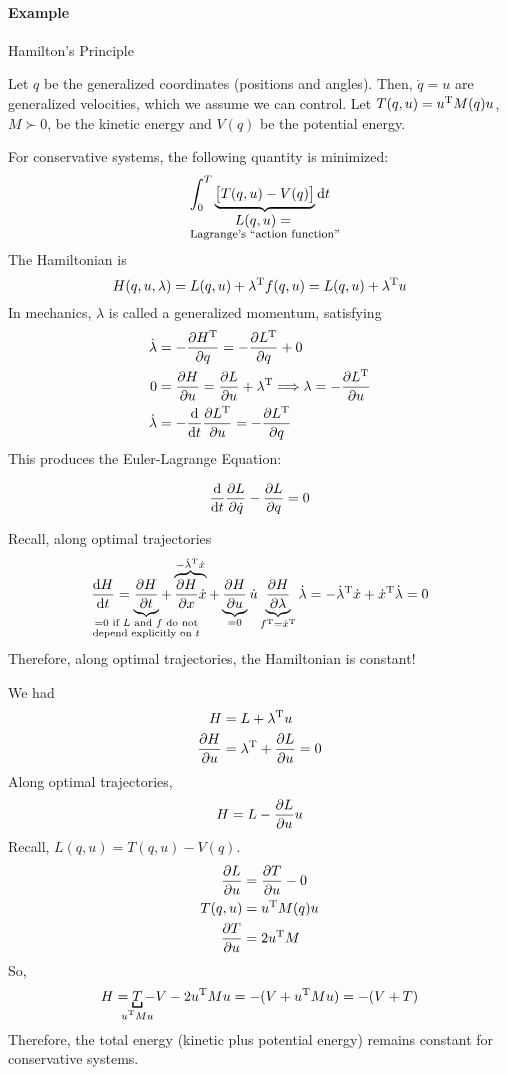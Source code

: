 \paragraph{Example} Hamilton's Principle

Let $q$ be the generalized coordinates (positions and angles). Then, $\dot q = u$ are generalized velocities, which we assume we can control. Let $T(q,u)=u^\text{T} M(q) u$, $M\succ0$, be the kinetic energy and $V(q)$ be the potential energy.

For conservative systems, the following quantity is minimized:
\[ \int_0^T \underbrace{\big[ T(q,u) - V(q) \big]}_{\mathclap{\substack{\displaystyle L(q,u)={}\\ \text{\footnotesize Lagrange's ``action function''}}}} \dif t \]
The Hamiltonian is
\[ H(q,u,\lambda) = L(q,u) + \lambda^\text{T} f(q,u) = L(q,u) + \lambda^\text{T} u \]
In mechanics, $\lambda$ is called a generalized momentum, satisfying
\begin{align}
  \dot\lambda &= -\frac{\partial H^\text{T}}{\partial q} = -\frac{\partial L^\text{T}}{\partial q} + 0 \\
  0 &= \frac{\partial H}{\partial u} = \frac{\partial L}{\partial u} + \lambda^\text{T} \Longrightarrow \lambda = -\frac{\partial L^\text{T}}{\partial u} \\
  \dot\lambda &= -\frac{\mathop{}\!\mathrm{d}}{\mathop{}\!\mathrm{d} t} \frac{\partial L^\text{T}}{\partial u} = -\frac{\partial L^\text{T}}{\partial q}
\end{align}
This produces the Euler-Lagrange Equation:
\begin{framed}
  \[
    \frac{\mathop{}\!\mathrm{d}}{\mathop{}\!\mathrm{d} t} \frac{\partial L}{\partial \dot q} - \frac{\partial L}{\partial q} = 0
  \]
\end{framed}

Recall, along optimal trajectories
\[
  \frac{\dif H}{\dif t} = \underbrace{\pder{H}{t}}_{\mathclap{\substack{=0 \text{ if $L$ and $f$ do not}\\ \text{depend explicitly on $t$}}}} + \overbrace{\pder{H}{x}\dot x}^{-\dot\lambda\trans\dot x} + \underbrace{\pder{H}{u}}_{=0}\dot u \underbrace{\pder{H}{\lambda}}_{f\trans=\dot x\trans}\dot\lambda = -\dot\lambda\trans\dot x + \dot x\trans\dot\lambda = 0
\]
Therefore, along optimal trajectories, the Hamiltonian is constant!

We had
\begin{align}
  H &= L + \lambda^\text{T} u \\
  \frac{\partial H}{\partial u} &= \lambda^\text{T} + \frac{\partial L}{\partial u} = 0
\end{align}
Along optimal trajectories,
\[ H = L - \frac{\partial L}{\partial u} u \]
Recall, $L(q,u)=T(q,u)-V(q)$.
\begin{align}
  \frac{\partial L}{\partial u} &= \frac{\partial T}{\partial u} - 0 \\
  T(q,u) &= u^\text{T} M(q) u \\
  \frac{\partial T}{\partial u} &= 2u^\text{T} M
\end{align}
So,
\[ H = \underbracket[1pt]{T}_{\mathclap{u\trans Mu}} - V - 2u\trans M u = -(V + u\trans M u) = -(V+T) \]
Therefore, the total energy (kinetic plus potential energy) remains constant for conservative systems.

